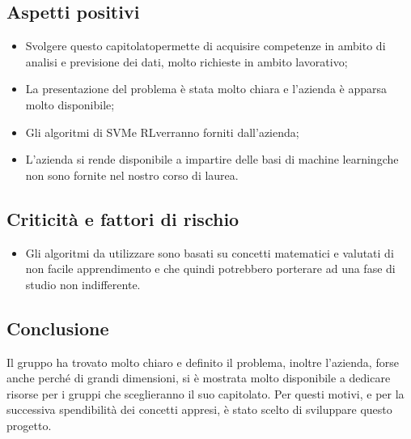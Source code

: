 \subsection{Aspetti positivi}
\begin{itemize} 
	\item Svolgere questo capitolato\glosp permette di acquisire competenze in ambito di analisi e previsione dei dati, molto richieste in ambito lavorativo;
	\item La presentazione del problema è stata molto chiara e l'azienda è apparsa molto disponibile;
	\item Gli algoritmi di SVM\glosp e RL\glosp verranno forniti dall'azienda;
    \item L'azienda si rende disponibile a impartire delle basi di machine learning\glosp che non sono fornite nel nostro corso di laurea.
\end{itemize}
\subsection{Criticità e fattori di rischio}
\begin{itemize}
	\item Gli algoritmi da utilizzare sono basati su concetti matematici e valutati di non facile apprendimento e che quindi potrebbero porterare ad una fase di studio non indifferente. 
\end{itemize}
\subsection{Conclusione}
Il gruppo ha trovato molto chiaro e definito il problema, inoltre l'azienda, forse anche perché di grandi dimensioni, si è mostrata molto disponibile a dedicare risorse per i gruppi che sceglieranno il suo capitolato\glosp. Per questi motivi, e per la successiva spendibilità dei concetti appresi, è stato scelto di sviluppare questo progetto\glo.
